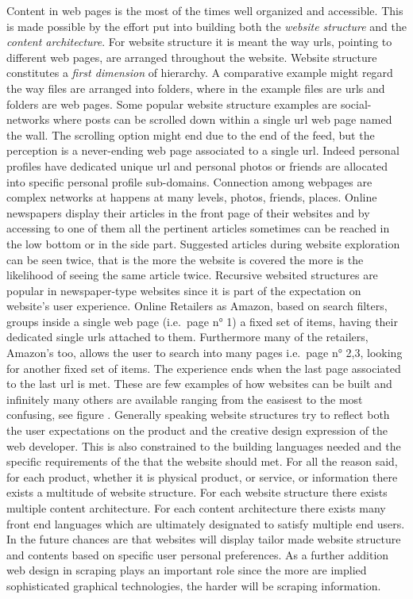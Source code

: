 \documentclass[
  12pt,
  a4paper,
  oneside]{book}
\theoremstyle{definition}
\theoremstyle{definition}
\theoremstyle{definition}
\theoremstyle{remark}
\begin{document}
Content in web pages is the most of the times well organized and accessible.
This is made possible by the effort put into building both the \emph{website structure} and the \emph{content architecture}. For website structure it is meant the way urls, pointing to different web pages, are arranged throughout the website.
Website structure constitutes a \emph{first dimension} of hierarchy. A comparative example might regard the way files are arranged into folders, where in the example files are urls and folders are web pages.
Some popular website structure examples are social-networks where posts can be scrolled down within a single url web page named the wall. The scrolling option might end due to the end of the feed, but the perception is a never-ending web page associated to a single url. Indeed personal profiles have dedicated unique url and personal photos or friends are allocated into specific personal profile sub-domains. Connection among webpages are complex networks at happens at many levels, photos, friends, places.
Online newspapers display their articles in the front page of their websites and by accessing to one of them all the pertinent articles sometimes can be reached in the low bottom or in the side part. Suggested articles during website exploration can be seen twice, that is the more the website is covered the more is the likelihood of seeing the same article twice. Recursive websited structures are popular in newspaper-type websites since it is part of the expectation on website's user experience.
Online Retailers as Amazon, based on search filters, groups inside a single web page (i.e.~page n° 1) a fixed set of items, having their dedicated single urls attached to them. Furthermore many of the retailers, Amazon's too, allows the user to search into many pages i.e.~page n° 2,3, looking for another fixed set of items. The experience ends when the last page associated to the last url is met.
These are few examples of how websites can be built and infinitely many others are available ranging from the easisest to the most confusing, see figure .
Generally speaking website structures try to reflect both the user expectations on the product and the creative design expression of the web developer. This is also constrained to the building languages needed and the specific requirements of the that the website should met. For all the reason said, for each product, whether it is physical product, or service, or information there exists a multitude of website structure. For each website structure there exists multiple content architecture. For each content architecture there exists many front end languages which are ultimately designated to satisfy multiple end users. In the future chances are that websites will display tailor made website structure and contents based on specific user personal preferences. As a further addition web design in scraping plays an important role since the more are implied sophisticated graphical technologies, the harder will be scraping information.
\end{document}
